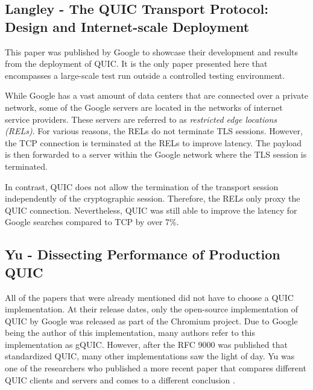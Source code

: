 \documentclass[conference]{IEEEtran}
\begin{document}
\subsection{Langley - The QUIC Transport Protocol: Design and Internet-scale Deployment}

This paper was published by Google to showcase their development and results from the deployment of QUIC. It is the only paper presented here that encompasses a large-scale test run outside a controlled testing environment.

While Google has a vast amount of data centers that are connected over a private network, some of the Google servers are located in the networks of internet service providers. These servers are referred to as \textit{restricted edge locations (RELs)}. For various reasons, the RELs do not terminate TLS sessions. However, the TCP connection is terminated at the RELs to improve latency. The payload is then forwarded to a server within the Google network where the TLS session is terminated. \cite{Google}

In contrast, QUIC does not allow the termination of the transport session independently of the cryptographic session. Therefore, the RELs only proxy the QUIC connection. Nevertheless, QUIC was still able to improve the latency for Google searches compared to TCP by over 7\%. 


\subsection{Yu - Dissecting Performance of Production QUIC}

All of the papers that were already mentioned did not have to choose a QUIC implementation. At their release dates, only the open-source implementation of QUIC by Google was released as part of the Chromium project. Due to Google being the author of this implementation, many authors refer to this implementation as gQUIC. However, after the RFC 9000 was published that standardized QUIC, many other implementations saw the light of day. Yu was one of the researchers who published a more recent paper that compares different QUIC clients and servers and comes to a different conclusion \cite{Yu2}. 
\end{document}
